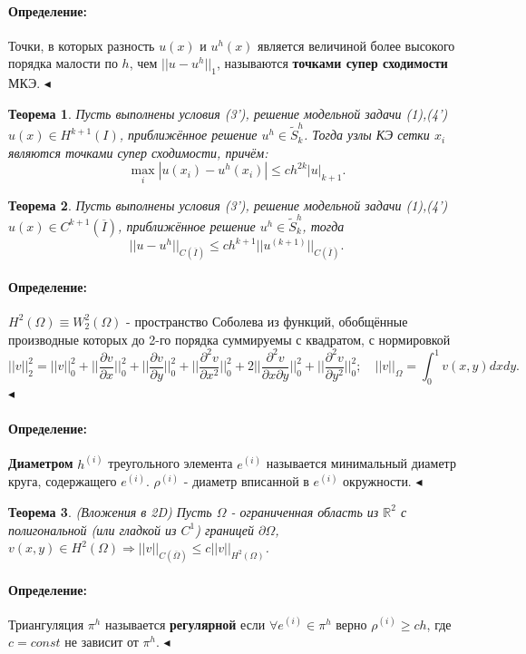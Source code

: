 \documentclass{article}
\newtheorem{theorem}{Теорема}
\newenvironment{definition}{ \paragraph{Определение:}}{\hfill $\blacktriangleleft$}
\begin{document}
\begin{definition}
	Точки, в которых разность $u(x)$ и $u^{h}(x)$ является величиной более высокого порядка малости по $h$, чем $||u - u^h||_1$, называются \textbf{точками супер сходимости} МКЭ.
\end{definition}

\begin{theorem}
	Пусть выполнены условия (3'), решение модельной задачи (1),(4') $u(x) \in H^{k+1} (I)$, приближённое решение $u^h \in \tilde{S}_k^h$. Тогда узлы КЭ сетки $x_i$ являются точками супер сходимости, причём:
	\[
	\max\limits_{i} |u(x_i) - u^h(x_i)| \leqslant c h^{2k} |u|_{k+1}.	
	\]
\end{theorem}

\begin{theorem}
	Пусть выполнены условия (3'), решение модельной задачи (1),(4') $u(x) \in C^{k+1} (\overline{I})$, приближённое решение $u^h \in \tilde{S}_k^h$, тогда
	\[
	||u - u^h||_{C (\overline{I})} \leqslant c h^{k + 1} ||u^{(k+1)}||_{C (\overline{I})}.	
	\]
\end{theorem}

\begin{definition}
	$H^2(\Omega) \equiv W_2^2(\Omega)$ - пространство Соболева из функций, обобщённые производные которых до 2-го порядка суммируемы с квадратом, с нормировкой
	\[
	||v||_2^2 = ||v||_0^2 + ||\dfrac{\partial v}{\partial x}||_0^2 + ||\dfrac{\partial v}{\partial y}||_0^2 + 
				||\dfrac{\partial^2 v}{\partial x^2}||_0^2 + 2 ||\dfrac{\partial^2 v}{\partial x \partial y }||_0^2 + ||\dfrac{\partial^2 v}{\partial y^2}||_0^2;
	\quad ||v||_{\Omega} = \int_0^1 v(x,y) dx dy.
	\]
\end{definition}

\begin{definition}
	\textbf{Диаметром} $h^{(i)}$ треугольного элемента $e^{(i)}$ называется минимальный диаметр круга, содержащего $e^{(i)}$. $\rho ^{(i)}$ - диаметр вписанной в $e^{(i)}$ окружности.
\end{definition}

\begin{theorem}
	(Вложения в 2D) Пусть $\Omega$ - ограниченная область из $\mathbb{R}^2$ с полигональной (или гладкой из $C^1$) границей $\partial \Omega$, $v(x,y) \in H^2(\Omega) \Rightarrow ||v||_{C(\overline{\Omega})} \leqslant c ||v||_{H^2(\Omega)}$.
\end{theorem}

\begin{definition}
	Триангуляция $\pi^h$ называется  \textbf{регулярной} если $\forall e^{(i)} \in \pi^h$ верно $\rho ^{(i)} \geqslant ch$, где $c = const$ не зависит от $\pi^h$.
\end{definition}
\end{document}
